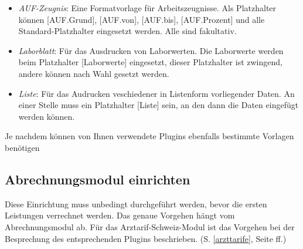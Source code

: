 \begin{itemize}
 \item \textit{AUF-Zeugnis}: Eine Formatvorlage für Arbeitszeugnisse. Als Platzhalter können [AUF.Grund], [AUF.von], [AUF.bis], [AUF.Prozent] und alle Standard-Platzhalter eingesetzt werden. Alle sind fakultativ.


 \item \textit{Laborblatt}: Für das Ausdrucken von Laborwerten. Die Laborwerte werden beim Platzhalter [Laborwerte] eingesetzt, dieser Platzhalter ist zwingend, andere können nach Wahl gesetzt werden.
 \item \textit{Liste}: Für das Audrucken veschiedener in Listenform vorliegender Daten. An einer Stelle muss ein Platzhalter [Liste] sein, an den dann die Daten eingefügt werden können.
\end{itemize}

Je nachdem können von Ihnen verwendete Plugins ebenfalls bestimmte Vorlagen benötigen

\subsection{Abrechnungsmodul einrichten}
\label{conf:abrechnung}
Diese Einrichtung muss unbedingt durchgeführt werden, bevor die ersten Leistungen verrechnet werden. Das genaue Vorgehen hängt vom Abrechnungsmodul ab. Für das Arztarif-Schweiz-Modul ist das Vorgehen bei der Besprechung des entsprechenden Plugins beschrieben. (S. \ref{arzttarife}, Seite \pageref{arzttarife} ff.)

